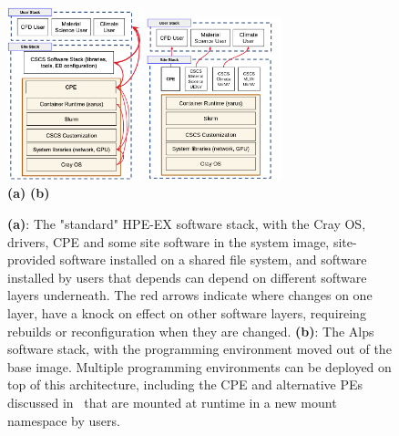 \begin{figure}[htp!]
    \begin{center}
        \includegraphics[width=0.35\textwidth]{./images/stack-old.png}
        \hspace{2.5cm}
        \includegraphics[width=0.35\textwidth]{./images/stack-new.png}
        \\
        \textbf{(a)} \hspace{9cm} \textbf{(b)}\\
    \end{center}
    \caption{
        \textbf{(a)}:
        The "standard" HPE-EX software stack, with the Cray OS, drivers, CPE and some site software in the system image, site-provided software installed on a shared file system, and software installed by users that depends can depend on different software layers underneath.
        The red arrows indicate where changes on one layer, have a knock on effect on other software layers, requireing rebuilds or reconfiguration when they are changed.\newline
        \textbf{(b)}:
        The Alps software stack, with the programming environment moved out of the base image.
        Multiple programming environments can be deployed on top of this architecture, including the CPE and alternative PEs discussed in~ that are mounted at runtime in a new mount namespace by users.
    }
    \label{fig:stacks}
\end{figure}

